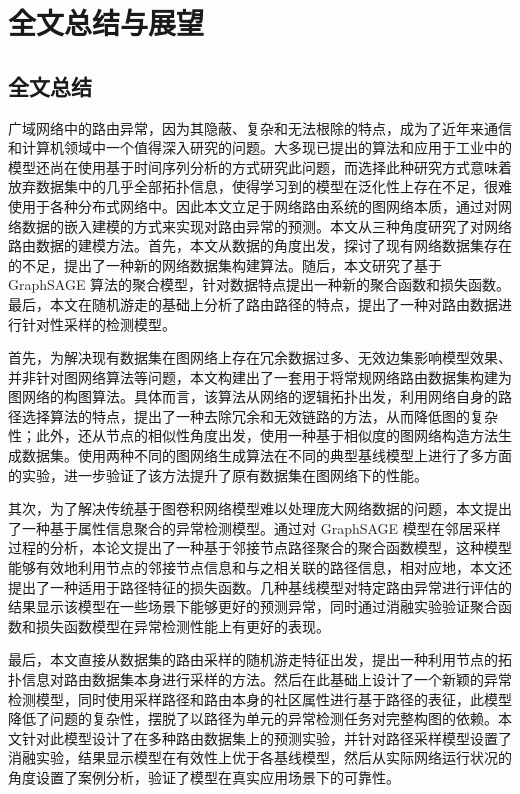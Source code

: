 \chapter{全文总结与展望}


\section{全文总结}

广域网络中的路由异常，因为其隐蔽、复杂和无法根除的特点，成为了近年来通信和计算机领域中一个值得深入研究的问题。大多现已提出的算法和应用于工业中的模型还尚在使用基于时间序列分析的方式研究此问题，而选择此种研究方式意味着放弃数据集中的几乎全部拓扑信息，使得学习到的模型在泛化性上存在不足，很难使用于各种分布式网络中。因此本文立足于网络路由系统的图网络本质，通过对网络数据的嵌入建模的方式来实现对路由异常的预测。本文从三种角度研究了对网络路由数据的建模方法。首先，本文从数据的角度出发，探讨了现有网络数据集存在的不足，提出了一种新的网络数据集构建算法。随后，本文研究了基于 GraphSAGE 算法的聚合模型，针对数据特点提出一种新的聚合函数和损失函数。最后，本文在随机游走的基础上分析了路由路径的特点，提出了一种对路由数据进行针对性采样的检测模型。

首先，为解决现有数据集在图网络上存在冗余数据过多、无效边集影响模型效果、并非针对图网络算法等问题，本文构建出了一套用于将常规网络路由数据集构建为图网络的构图算法。具体而言，该算法从网络的逻辑拓扑出发，利用网络自身的路径选择算法的特点，提出了一种去除冗余和无效链路的方法，从而降低图的复杂性；此外，还从节点的相似性角度出发，使用一种基于相似度的图网络构造方法生成数据集。使用两种不同的图网络生成算法在不同的典型基线模型上进行了多方面的实验，进一步验证了该方法提升了原有数据集在图网络下的性能。

其次，为了解决传统基于图卷积网络模型难以处理庞大网络数据的问题，本文提出了一种基于属性信息聚合的异常检测模型。通过对 GraphSAGE 模型在邻居采样过程的分析，本论文提出了一种基于邻接节点路径聚合的聚合函数模型，这种模型能够有效地利用节点的邻接节点信息和与之相关联的路径信息，相对应地，本文还提出了一种适用于路径特征的损失函数。几种基线模型对特定路由异常进行评估的结果显示该模型在一些场景下能够更好的预测异常，同时通过消融实验验证聚合函数和损失函数模型在异常检测性能上有更好的表现。

最后，本文直接从数据集的路由采样的随机游走特征出发，提出一种利用节点的拓扑信息对路由数据集本身进行采样的方法。然后在此基础上设计了一个新颖的异常检测模型，同时使用采样路径和路由本身的社区属性进行基于路径的表征，此模型降低了问题的复杂性，摆脱了以路径为单元的异常检测任务对完整构图的依赖。本文针对此模型设计了在多种路由数据集上的预测实验，并针对路径采样模型设置了消融实验，结果显示模型在有效性上优于各基线模型，然后从实际网络运行状况的角度设置了案例分析，验证了模型在真实应用场景下的可靠性。

